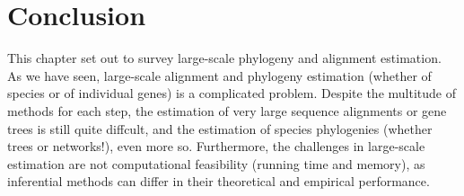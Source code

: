 \chapter*{Conclusion}
This chapter set out to survey large-scale phylogeny and alignment estimation. 
As we have seen, large-scale alignment and phylogeny estimation 
(whether of species or of individual genes) is a complicated problem. 
Despite the multitude of methods for each step, the estimation of very 
large sequence alignments or gene trees is still quite diffcult, 
and the estimation of species phylogenies (whether trees or networks!), 
even more so. Furthermore, the challenges in large-scale estimation 
are not computational feasibility (running time and memory), as 
inferential methods can differ in their theoretical and empirical 
performance. 

\newpage